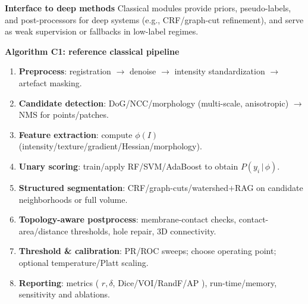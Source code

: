 \medskip
\noindent\textbf{Interface to deep methods}\;
Classical modules provide priors, pseudo-labels, and post-processors for deep systems (e.g., CRF/graph-cut refinement), and serve as weak supervision or fallbacks in low-label regimes.

\medskip
\noindent\textbf{Algorithm C1: reference classical pipeline}\;
\begin{enumerate}
  \item \textbf{Preprocess}: registration \(\rightarrow\) denoise \(\rightarrow\) intensity standardization \(\rightarrow\) artefact masking.
  \item \textbf{Candidate detection}: DoG/NCC/morphology (multi-scale, anisotropic) \(\rightarrow\) NMS for points/patches.
  \item \textbf{Feature extraction}: compute \(\phi(I)\) (intensity/texture/gradient/Hessian/morphology).
  \item \textbf{Unary scoring}: train/apply RF/SVM/AdaBoost to obtain \(P(y_i\,|\,\phi)\).
  \item \textbf{Structured segmentation}: CRF/graph-cuts/watershed\(+\)RAG on candidate neighborhoods or full volume.
  \item \textbf{Topology-aware postprocess}: membrane-contact checks, contact-area/distance thresholds, hole repair, 3D connectivity.
  \item \textbf{Threshold \& calibration}: PR/ROC sweeps; choose operating point; optional temperature/Platt scaling.
  \item \textbf{Reporting}: metrics ( \(r,\delta\), Dice/VOI/RandF/AP ), run-time/memory, sensitivity and ablations.
\end{enumerate}

